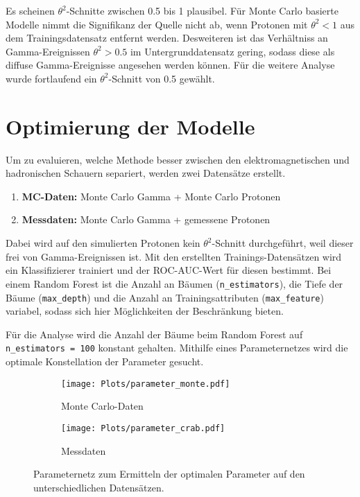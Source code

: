 Es scheinen $\theta^{2}$-Schnitte zwischen \num{0.5} bis \num{1} plausibel. 
Für Monte Carlo basierte Modelle nimmt die Signifikanz der Quelle nicht ab, wenn Protonen mit $\theta^{2} < \num{1}$ aus dem Trainingsdatensatz entfernt werden. 
Desweiteren ist das Verhältniss an Gamma-Ereignissen $\theta^{2} > \num{0.5}$ im Untergrunddatensatz gering, sodass diese als diffuse Gamma-Ereignisse angesehen werden können. 
Für die weitere Analyse wurde fortlaufend ein $\theta^{2}$-Schnitt von \num{0.5} gewählt. 
\newpage
\section{Optimierung der Modelle}
Um zu evaluieren, welche Methode besser zwischen den elektromagnetischen und hadronischen Schauern separiert, werden zwei Datensätze erstellt. 
\begin{enumerate}
  \item \textbf{MC-Daten:} Monte Carlo Gamma + Monte Carlo Protonen
  \item \textbf{Messdaten:} Monte Carlo Gamma + gemessene Protonen 
\end{enumerate}
Dabei wird auf den simulierten Protonen kein $\theta^{2}$-Schnitt durchgeführt, weil dieser frei von Gamma-Ereignissen ist.
Mit den erstellten Trainings-Datensätzen wird ein Klassifizierer trainiert und der ROC-AUC-Wert für diesen bestimmt.
Bei einem Random Forest ist die Anzahl an Bäumen (\texttt{n\_estimators}), die Tiefe der Bäume (\texttt{max\_depth}) und die Anzahl an Trainingsattributen (\texttt{max\_feature}) variabel, sodass sich hier Möglichkeiten der Beschränkung bieten.

Für die Analyse wird die Anzahl der Bäume beim Random Forest auf \texttt{n\_estimators = 100} konstant gehalten. 
Mithilfe eines Parameternetzes wird die optimale Konstellation der Parameter gesucht. 
\begin{figure}
  \begin{subfigure}[b]{0.5\textwidth}
	\texttt{[image: Plots/parameter\_monte.pdf]}
	\caption{Monte Carlo-Daten}
	\label{fig:mcGrid}
  \end{subfigure}
  \begin{subfigure}[b]{0.5\textwidth}
	\texttt{[image: Plots/parameter\_crab.pdf]}
	\caption{Messdaten}
	\label{fig:messGrid}
  \end{subfigure}
  \caption{Parameternetz zum Ermitteln der optimalen Parameter auf den unterschiedlichen Datensätzen.}
\end{figure}

